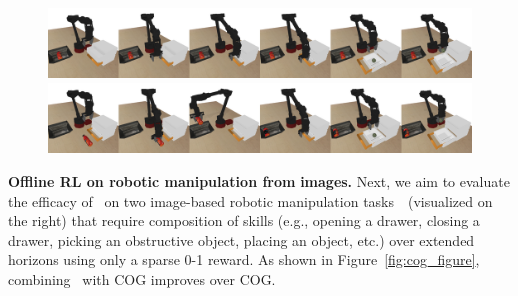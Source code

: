 


\begin{figure}
\small \begin{center}
\vspace{-30pt}
\includegraphics[width=0.99\linewidth]{figures/close_open_grasp (1).png}
\includegraphics[width=0.99\linewidth]{figures/pickplace_open_grasp.png}
\vspace{-20pt}
\end{center}
\end{figure}
\textbf{{Offline RL on robotic manipulation from}} \textbf{{images.}} Next, we aim to evaluate the efficacy of \methodname\ on two image-based robotic manipulation tasks~\citep{singh2020cog}~(visualized on the right) that require composition of skills (e.g., opening a drawer, closing a drawer, picking an obstructive object, placing an object, etc.) over extended horizons using only a sparse 0-1 reward. 
As shown in Figure~\ref{fig:cog_figure}, combining \methodname\ with COG improves over COG.

